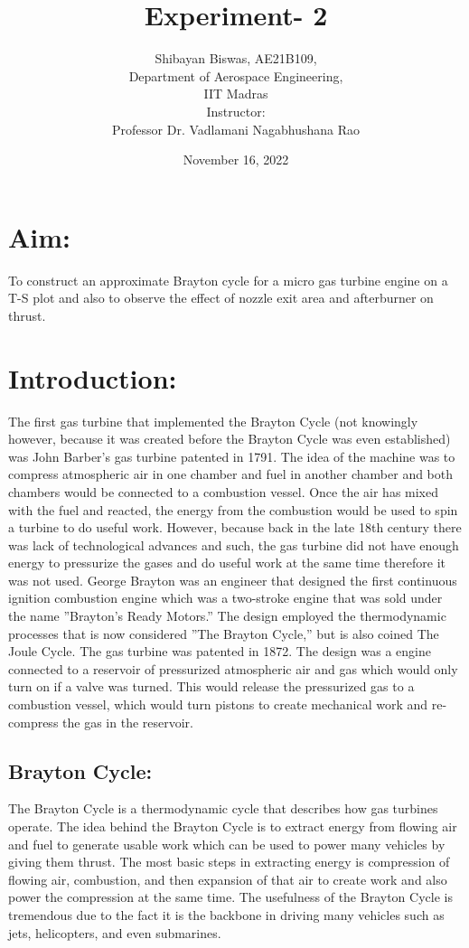 \documentclass[12pt,a4paper]{article}
\author{Shibayan Biswas, AE21B109,\\ Department of Aerospace Engineering,\\ IIT Madras\\[3ex] Instructor:\\ \large Professor Dr. Vadlamani Nagabhushana Rao}
\title{Experiment- 2}
\date{November 16, 2022}
\begin{document}
\maketitle
\hline
\section{Aim:}
To construct an approximate Brayton cycle for a micro gas turbine engine on a T-S plot and also to observe the effect of nozzle exit area and afterburner on thrust.
\section{Introduction:}
The first gas turbine that implemented the Brayton Cycle (not knowingly however, because it was created before the Brayton Cycle was even established) was John Barber’s gas turbine patented in 1791. The idea of the machine was to compress atmospheric air in one chamber and fuel in another chamber and both chambers would be connected to a combustion vessel. Once the air has mixed with the fuel and reacted, the energy from the combustion would be used to spin a turbine to do useful work. However, because back in the late 18th century there was lack
of technological advances and such, the gas turbine did not have enough energy to pressurize the gases and do useful work at the same time therefore it was not used. George Brayton was an engineer that designed the first continuous ignition combustion engine which was a two-stroke engine that was sold under the name ”Brayton’s Ready Motors.” The design employed the thermodynamic processes that is now considered ”The Brayton Cycle,” but is also coined The Joule Cycle. The gas turbine was patented in 1872. The design was a engine connected to a reservoir of pressurized atmospheric air and gas which would only turn on if a valve was turned. This would release the pressurized gas to a combustion vessel, which would turn pistons to create mechanical work and re-compress the gas in the reservoir.
\subsection{Brayton Cycle:}
The Brayton Cycle is a thermodynamic cycle that describes how gas turbines operate. The idea
behind the Brayton Cycle is to extract energy from flowing air and fuel to generate usable work which can be used to power many vehicles by giving them thrust. The most basic steps in extracting energy is compression of flowing air, combustion, and then expansion of that air to create work and also power the compression at the same time. The usefulness of the Brayton Cycle is tremendous due to the fact it is the backbone in driving many vehicles such as jets, helicopters, and even submarines.
\end{document}
